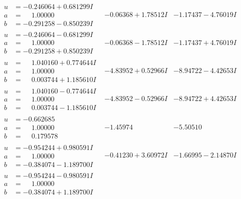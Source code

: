 \documentclass[1p]{elsarticle_modified}
\theoremstyle{definition}
\begin{document}
$$\begin{array}{c|c|c}
\begin{aligned}
u &= -0.246064 + 0.681299 I \\
a &= \phantom{-}1.00000\phantom{ +0.000000I} \\
b &= -0.291258 - 0.850239 I\end{aligned}
 & -0.06368 + 1.78512 I & -1.17437 - 4.76019 I \\ \hline\begin{aligned}
u &= -0.246064 - 0.681299 I \\
a &= \phantom{-}1.00000\phantom{ +0.000000I} \\
b &= -0.291258 + 0.850239 I\end{aligned}
 & -0.06368 - 1.78512 I & -1.17437 + 4.76019 I \\ \hline\begin{aligned}
u &= \phantom{-}1.040160 + 0.774644 I \\
a &= \phantom{-}1.00000\phantom{ +0.000000I} \\
b &= \phantom{-}0.003744 + 1.185610 I\end{aligned}
 & -4.83952 + 0.52966 I & -8.94722 - 4.42653 I \\ \hline\begin{aligned}
u &= \phantom{-}1.040160 - 0.774644 I \\
a &= \phantom{-}1.00000\phantom{ +0.000000I} \\
b &= \phantom{-}0.003744 - 1.185610 I\end{aligned}
 & -4.83952 - 0.52966 I & -8.94722 + 4.42653 I \\ \hline\begin{aligned}
u &= -0.662685\phantom{ +0.000000I} \\
a &= \phantom{-}1.00000\phantom{ +0.000000I} \\
b &= \phantom{-}0.179578\phantom{ +0.000000I}\end{aligned}
 & -1.45974\phantom{ +0.000000I} & -5.50510\phantom{ +0.000000I} \\ \hline\begin{aligned}
u &= -0.954244 + 0.980591 I \\
a &= \phantom{-}1.00000\phantom{ +0.000000I} \\
b &= -0.384074 - 1.189700 I\end{aligned}
 & -0.41230 + 3.60972 I & -1.66995 - 2.14870 I \\ \hline\begin{aligned}
u &= -0.954244 - 0.980591 I \\
a &= \phantom{-}1.00000\phantom{ +0.000000I} \\
b &= -0.384074 + 1.189700 I\end{aligned}

\end{array}$$
\end{document}
